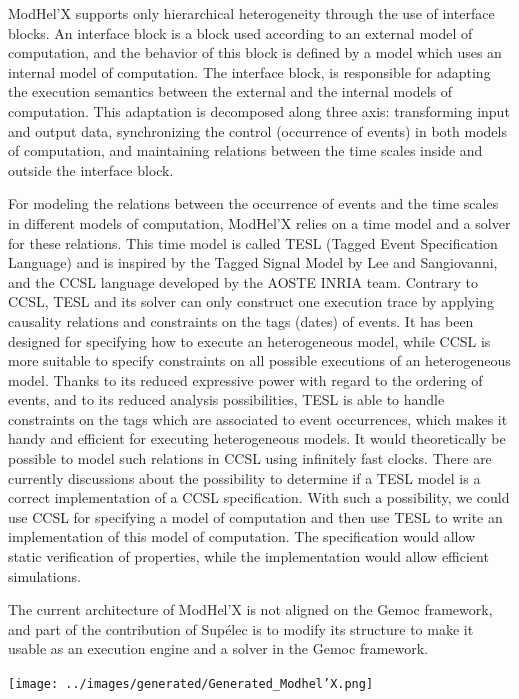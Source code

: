 \documentclass{gemoc} %
\begin{document}
ModHel'X supports only hierarchical heterogeneity through the use of interface blocks. An interface block is a block used according to an external model of computation, and the behavior of this block is defined by a model which uses an internal model of computation. The interface block, is responsible for adapting the execution semantics between the external and the internal models of computation. This adaptation is decomposed along three axis: transforming input and output data, synchronizing the control (occurrence of events) in both models of computation, and maintaining relations between the time scales inside and outside the interface block.

For modeling the relations between the occurrence of events and the time scales in different models of computation, ModHel'X relies on a time model and a solver for these relations. This time model is called TESL (Tagged Event Specification Language) and is inspired by the Tagged Signal Model by Lee and Sangiovanni, and the CCSL language developed by the AOSTE INRIA team. Contrary to CCSL, TESL and its solver can only construct one execution trace by applying causality relations and constraints on the tags (dates) of events. It has been designed for specifying how to execute an heterogeneous model, while CCSL is more suitable to specify constraints on all possible executions of an heterogeneous model. Thanks to its reduced expressive power with regard to the ordering of events, and to its reduced analysis possibilities, TESL is able to handle constraints on the tags which are associated to event occurrences, which makes it handy and efficient for executing heterogeneous models. It would theoretically be possible to model such relations in CCSL using infinitely fast clocks. There are currently discussions about the possibility to determine if a TESL model is a correct implementation of a CCSL specification. With such a possibility, we could use CCSL for specifying a model of computation and then use TESL to write an implementation of this model of computation. The specification would allow static verification of properties, while the implementation would allow efficient simulations.

The current architecture of ModHel'X is not aligned on the Gemoc framework, and part of the contribution of Sup\'elec is to modify its structure to make it usable as an execution engine and a solver in the Gemoc framework.

\begin{center}
\texttt{[image: ../images/generated/Generated\_Modhel'X.png]}
\end{center}
\end{document}
